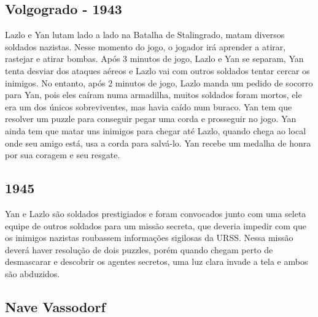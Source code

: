 \documentclass[12pt, a4paper]{article}
\begin{document}
	\subsection{Volgogrado - 1943}

	Lazlo e Yan lutam lado a lado na Batalha de Stalingrado, matam 
    diversos soldados nazistas. Nesse momento do jogo, o jogador irá 
    aprender a atirar, rastejar e  atirar bombas. Após 3 minutos de 
    jogo, Lazlo e Yan se separam, Yan tenta desviar dos ataques aéreos 
    e Lazlo vai com outros soldados tentar cercar os inimigos. No entanto,
    após 2 minutos de jogo, Lazlo manda um pedido de socorro para Yan, 
    pois eles caíram numa armadilha, muitos soldados foram mortos, ele 
    era um dos únicos sobreviventes, mas havia caído num buraco. Yan tem 
    que resolver um puzzle para conseguir pegar uma corda e prosseguir 
    no jogo. Yan ainda tem que matar uns inimigos para chegar até Lazlo,
    quando chega ao local onde seu amigo está, usa a corda para salvá-lo.
	Yan recebe um medalha de honra por sua coragem e seu resgate.

	\subsection{1945}

	Yan e Lazlo são soldados prestigiados e foram convocados junto
    com uma seleta equipe de outros soldados para um missão secreta,
    que deveria impedir com que os inimigos nazistas roubassem
    informações sigilosas da URSS. Nessa missão deverá haver resolução 
    de dois puzzles, porém quando chegam perto de desmascarar e 
    descobrir os agentes secretos, uma luz clara invade a tela e 
    ambos são abduzidos.

	\subsection{Nave Vassodorf}
\end{document}
